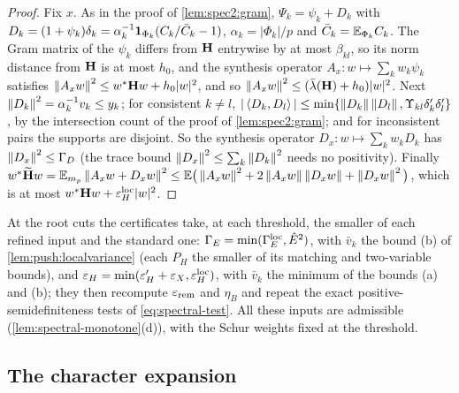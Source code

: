 \begin{proof}
Fix $x$. As in the proof of \cref{lem:spec2:gram}, $\Psi_k=\psi_k+D_k$ with
$D_k=(1+\psi_k)\delta_k=\alpha_k^{-1}\mathbf 1_{\Phi_k}(C_k/\bar C_k-1)$, $\alpha_k=|\Phi_k|/p$ and
$\bar C_k=\mathbb E_{\Phi_k}C_k$. The Gram
matrix of the $\psi_k$ differs from $\mathbf H$ entrywise by at most $\beta_{kl}$, so its
norm distance from $\mathbf H$ is at most $h_0$, and the synthesis operator
$A_x\colon w\mapsto\sum_kw_k\psi_k$ satisfies $\left\|A_xw\right\|^2\le w^*\mathbf H w+h_0|w|^2$, and so
$\left\|A_xw\right\|^2\le(\bar\lambda(\mathbf H)+h_0)|w|^2$. Next
$\left\|D_k\right\|^2=\alpha_k^{-1}v_k\le y_k$; for consistent $k\ne l$,
$|\left\langle D_k,D_l\right\rangle|\le\min\{\left\|D_k\right\|\left\|D_l\right\|,\Upsilon_{kl}\delta'_k\delta'_l\}$, by the
intersection count of the proof of \cref{lem:spec2:gram}; and for inconsistent
pairs the supports are disjoint. So the synthesis operator $D_x\colon
w\mapsto\sum_kw_kD_k$ has $\left\|D_x\right\|^2\le\Gamma_D$ (the trace bound
$\left\|D_x\right\|^2\le\sum_k\left\|D_k\right\|^2$ needs no positivity). Finally
$w^*\widetilde{\mathbf H} w=\mathbb E_{m_p}\left\|A_xw+D_xw\right\|^2\le\mathbb E\big(\left\|A_xw\right\|^2+2\left\|A_xw\right\|\left\|D_xw\right\|
+\left\|D_xw\right\|^2\big)$, which is at most $w^*\mathbf H w+\varepsilon^{\rm loc}_H|w|^2$.
\end{proof}

At the root cuts the certificates take, at each threshold, the smaller of each
refined input and the standard one: $\Gamma_E=\min(\Gamma^{\rm loc}_E,\hat E^2)$, with
$\bar v_k$ the bound (b) of \cref{lem:push:localvariance} (each $P_H$ the smaller of its
matching and two-variable bounds), and $\varepsilon_H=\min(\varepsilon'_H+\varepsilon_X,\varepsilon^{\rm loc}_H)$, with
$\bar v_k$ the minimum of the bounds (a) and (b); they then
recompute $\varepsilon_{\rm rem}$ and $\eta_B$ and repeat the exact
positive-semidefiniteness tests of \eqref{eq:spectral-test}.
All these inputs are admissible
(\cref{lem:spectral-monotone}(d)), with the Schur weights fixed at the threshold.

\subsection{The character expansion}\label{subsec:spec:perp}

